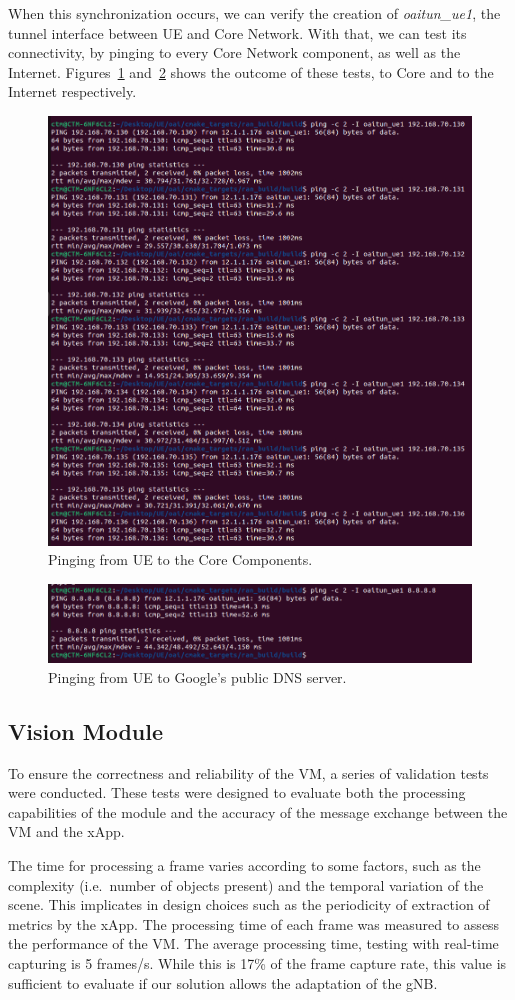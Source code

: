 When this synchronization occurs, we can verify the creation of \textit{oaitun\_ue1}, the tunnel interface between UE and Core Network.
With that, we can test its connectivity, by pinging to every Core Network component, as well as the Internet.
Figures~\ref{fig:ping_ue_core} and~\ref{fig:ping_ue_internet} shows the outcome of these tests, to Core and to the Internet respectively.

\begin{figure}[H]
    \centering
    \includegraphics[width=0.5\linewidth]{figures/ue_core_ping}
    \caption{Pinging from UE to the Core Components.}
    \label{fig:ping_ue_core}
\end{figure}

\begin{figure}[H]
    \centering
    \includegraphics[width=0.5\linewidth]{figures/ue_to_ext}
    \caption{Pinging from UE to Google's public DNS server.}
    \label{fig:ping_ue_internet}
\end{figure}


\subsection{Vision Module}\label{subsec:cv_module}
To ensure the correctness and reliability of the VM, a series of validation tests were conducted.
These tests were designed to evaluate both the processing capabilities of the module and the accuracy of the message exchange between the VM and the xApp.

The time for processing a frame varies according to some factors, such as the complexity (i.e.\ number of objects present) and the temporal variation of the scene.
This implicates in design choices such as the periodicity of extraction of metrics by the xApp.
The processing time of each frame was measured to assess the performance of the VM\@.
The average processing time, testing with real-time capturing is 5 frames/s\@.
While this is 17\% of the frame capture rate, this value is sufficient to evaluate if our solution allows the adaptation of the gNB\@.

